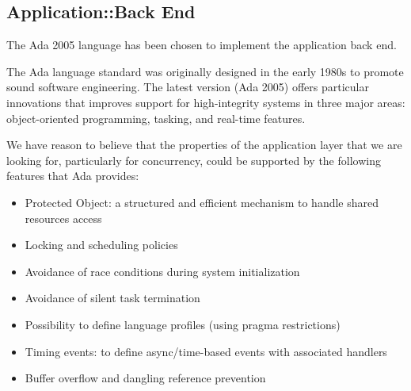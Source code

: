 \subsection{Application::Back End}
The Ada 2005 language has been chosen to implement the application back end.

The Ada language standard was originally designed in the early 1980s to promote
sound software engineering. The latest version (Ada 2005) offers particular 
innovations that improves support for high-integrity systems in three major 
areas: object-oriented programming, tasking, and real-time features.

We have reason to believe that the properties of the application layer 
that we are looking for, particularly for concurrency, could be supported 
by the following features that Ada provides:
\begin{itemize}
    \item Protected Object: a structured and efficient mechanism to handle shared resources access
    \item Locking and scheduling policies
    \item Avoidance of race conditions during system initialization
    \item Avoidance of silent task termination
    \item Possibility to define language profiles (using pragma restrictions)
    \item Timing events: to define async/time-based events with associated 
handlers
    \item Buffer overflow and dangling reference prevention
\end{itemize}
